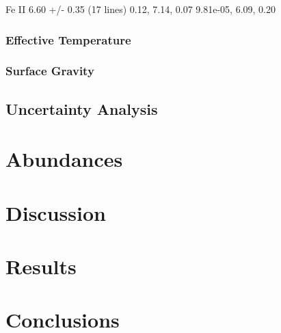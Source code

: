 \documentclass{emulateapj}
\begin{document}
Fe II 6.60 +/- 0.35 (17 lines)
0.12, 7.14, 0.07
9.81e-05, 6.09, 0.20

\subsubsection{Effective Temperature}

\subsubsection{Surface Gravity}

\subsection{Uncertainty Analysis}


\section{Abundances}


\section{Discussion}

\section{Results}

\section{Conclusions}
\end{document}
